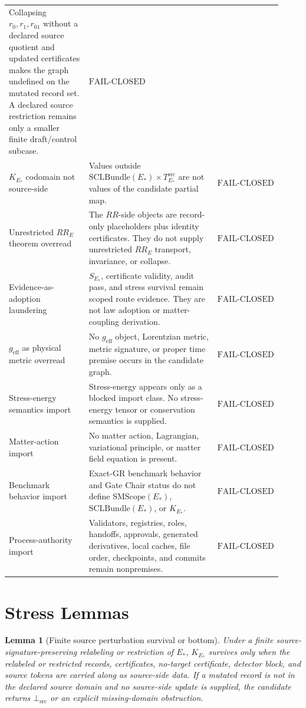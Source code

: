 \documentclass[11pt]{article}
\newcommand{\EStar}{E_{\ast}}
\newcommand{\SMScope}{\mathrm{SMScope}}
\newcommand{\SCLBundle}{\mathrm{SCLBundle}}
\newcommand{\KStar}{K_{E_{\ast}}}
\newcommand{\Src}{\mathrm{src}}
\newcommand{\BottomSrc}{\bot_{\mathrm{src}}}
\newcommand{\FailClosed}{\mathrm{FAIL}\mbox{-}\mathrm{CLOSED}}
\newtheorem{lemma}{Lemma}
\begin{document}
\begin{longtable}{p{0.30\linewidth}p{0.48\linewidth}p{0.14\linewidth}}
Collapsing \(r_0,r_1,r_{01}\) without a declared source quotient and updated
certificates makes the graph undefined on the mutated record set. A declared
source restriction remains only a smaller finite draft/control subcase. &
\(\FailClosed\) \\
\(\KStar\) codomain not source-side &
Values outside \(\SCLBundle(\EStar)\times T_{\EStar}^{\Src}\) are not values
of the candidate partial map. & \(\FailClosed\) \\
Unrestricted \(RR_E\) theorem overread &
The \(RR\)-side objects are record-only placeholders plus identity
certificates. They do not supply unrestricted \(RR_E\) transport,
invariance, or collapse. & \(\FailClosed\) \\
Evidence-as-adoption laundering &
\(S_{\EStar}\), certificate validity, audit pass, and stress survival remain
scoped route evidence. They are not law adoption or matter-coupling
derivation. & \(\FailClosed\) \\
\(g_{\mathrm{eff}}\) as physical metric overread &
No \(g_{\mathrm{eff}}\) object, Lorentzian metric, metric signature, or proper
time premise occurs in the candidate graph. & \(\FailClosed\) \\
Stress-energy semantics import &
Stress-energy appears only as a blocked import class. No stress-energy tensor
or conservation semantics is supplied. & \(\FailClosed\) \\
Matter-action import &
No matter action, Lagrangian, variational principle, or matter field equation
is present. & \(\FailClosed\) \\
Benchmark behavior import &
Exact-GR benchmark behavior and Gate Chair status do not define
\(\SMScope(\EStar)\), \(\SCLBundle(\EStar)\), or \(\KStar\). & \(\FailClosed\) \\
Process-authority import &
Validators, registries, roles, handoffs, approvals, generated derivatives,
local caches, file order, checkpoints, and commits remain nonpremises. &
\(\FailClosed\) \\
\bottomrule
\end{longtable}

\section{Stress Lemmas}

\begin{lemma}[Finite source perturbation survival or bottom]
Under a finite source-signature-preserving relabeling or restriction of
\(\EStar\), \(\KStar\) survives only when the relabeled or restricted records,
certificates, no-target certificate, detector block, and source tokens are
carried along as source-side data. If a mutated record is not in the declared
source domain and no source-side update is supplied, the candidate returns
\(\BottomSrc\) or an explicit missing-domain obstruction.
\end{lemma}
\end{document}
